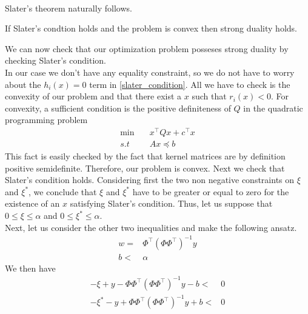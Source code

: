 \\
Slater's theorem naturally follows.
\begin{theorem}
    If Slater's condtion holds and the problem is convex then strong duality holds.
\end{theorem}
We can now check that our optimization problem posseses strong duality by checking Slater's condition.
\\
In our case we don't have any equality constraint, so we do not have to worry about the $h_i(x)=0$ term in \ref{slater_condition}. All we have to check is the convexity of our problem and that there exist a $x$ such that $r_i(x)<0$.
For convexity, a sufficient condition is the positive definiteness of $Q$ in the quadratic programming problem 
\begin{equation}
    \begin{aligned}
        \min \quad & x^\intercal Q x+ c^\intercal x \\        
        s.t \quad& Ax\preceq b
    \end{aligned}
\end{equation}
This fact is easily checked by the fact that kernel matrices are by definition positive semidefinite.
Therefore, our problem is convex.
Next we check that Slater's condition holds. Considering first the two non negative constraints on $\xi$ and $\xi^*$, we conclude that $\xi$  and $\xi^*$ have to be greater or equal to zero for the existence of an $x$ satisfying Slater's condition. Thus, let us suppose that $0 \leq \xi \leq \alpha$ and $0 \leq \xi^* \leq \alpha$.
\\
Next, let us consider the other two inequalities and make the following ansatz.
\\
\begin{equation}
    \begin{aligned}
        w=& \Phi^\intercal(\Phi \Phi^\intercal)^{-1} y\\
        b<& \alpha
    \end{aligned}
\end{equation}
We then have
\begin{equation}
    \begin{aligned}
        -\xi + y -\Phi\Phi^\intercal(\Phi \Phi^\intercal)^{-1}y-b<&0
        \\
        -\xi^* - y +\Phi\Phi^\intercal(\Phi \Phi^\intercal)^{-1}y+b<&0
    \end{aligned}
\end{equation}

